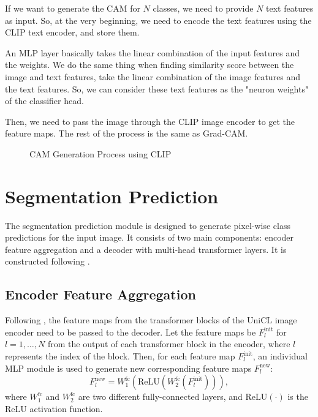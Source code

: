 If we want to generate the CAM for $N$ classes, we need to provide $N$ text features as input. So, at the very beginning, we need to encode the text features using the CLIP text encoder, and store them.

An MLP layer basically takes the linear combination of the input features and the weights. We do the same thing when finding similarity score between the image and text features, take the linear combination of the image features and the text features. So, we can consider these text features as the "neuron weights" of the classifier head.

Then, we need to pass the image through the CLIP image encoder to get the feature maps. The rest of the process is the same as Grad-CAM.


\begin{figure}[htbp]
    \centering
    \caption{CAM Generation Process using CLIP}
    \label{fig:cam_generation_process_clip}
\end{figure}

\section{Segmentation Prediction}
\label{sec:segmentation_prediction}
The segmentation prediction module is designed to generate pixel-wise class predictions for the input image. It consists of two main components: encoder feature aggregation and a decoder with multi-head transformer layers. It is constructed following \cite{wsss_frozen_clip}.

\subsection{Encoder Feature Aggregation}
\label{subsec:en_feature_agg}
Following \cite{wsss_frozen_clip}, the feature maps from the transformer blocks of the UniCL \cite{vl_unicl} image encoder need to be passed to the decoder. Let the feature maps be \( F_l^{\text{init}} \) for \( l = 1, \dots, N \) from the output of each transformer block in the encoder, where \( l \) represents the index of the block. Then, for each feature map \( F_l^{\text{init}} \), an individual MLP module is used to generate new corresponding feature maps \( F_l^{\text{new}} \):
\begin{equation}
    F_l^{\text{new}} = W_{1}^{\text{fc}} \left( \text{ReLU} \left( W_{2}^{\text{fc}}(F_l^{\text{init}}) \right) \right),
\end{equation}
where \( W_{1}^{\text{fc}} \) and \( W_{2}^{\text{fc}} \) are two different fully-connected layers, and \(\text{ReLU}(\cdot)\) is the ReLU activation function.


